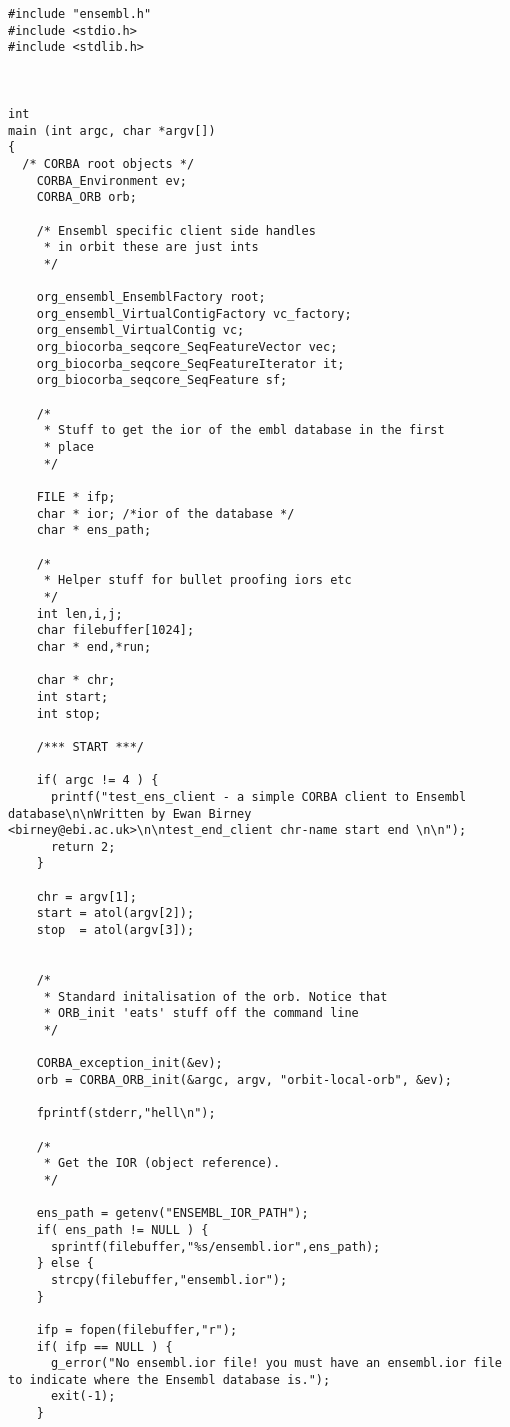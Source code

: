 \documentclass[11pt,a4paper]{article}
\begin{document}
\begin{verbatim}
#include "ensembl.h"
#include <stdio.h>
#include <stdlib.h>



int
main (int argc, char *argv[])
{
  /* CORBA root objects */
    CORBA_Environment ev;
    CORBA_ORB orb;

    /* Ensembl specific client side handles
     * in orbit these are just ints 
     */
    
    org_ensembl_EnsemblFactory root;
    org_ensembl_VirtualContigFactory vc_factory;
    org_ensembl_VirtualContig vc;
    org_biocorba_seqcore_SeqFeatureVector vec;
    org_biocorba_seqcore_SeqFeatureIterator it;
    org_biocorba_seqcore_SeqFeature sf;

    /*
     * Stuff to get the ior of the embl database in the first
     * place
     */
 
    FILE * ifp;
    char * ior; /*ior of the database */
    char * ens_path;

    /*
     * Helper stuff for bullet proofing iors etc
     */
    int len,i,j;
    char filebuffer[1024];
    char * end,*run;

    char * chr;
    int start;
    int stop;

    /*** START ***/

    if( argc != 4 ) {
      printf("test_ens_client - a simple CORBA client to Ensembl database\n\nWritten by Ewan Birney <birney@ebi.ac.uk>\n\ntest_end_client chr-name start end \n\n");
      return 2;
    }

    chr = argv[1];
    start = atol(argv[2]);
    stop  = atol(argv[3]);


    /*
     * Standard initalisation of the orb. Notice that
     * ORB_init 'eats' stuff off the command line
     */

    CORBA_exception_init(&ev);
    orb = CORBA_ORB_init(&argc, argv, "orbit-local-orb", &ev);

    fprintf(stderr,"hell\n");

    /*
     * Get the IOR (object reference).
     */

    ens_path = getenv("ENSEMBL_IOR_PATH");
    if( ens_path != NULL ) {
      sprintf(filebuffer,"%s/ensembl.ior",ens_path);
    } else {
      strcpy(filebuffer,"ensembl.ior");
    }

    ifp = fopen(filebuffer,"r");
    if( ifp == NULL ) {
      g_error("No ensembl.ior file! you must have an ensembl.ior file to indicate where the Ensembl database is.");
      exit(-1);
    }


\end{verbatim}
\end{document}

